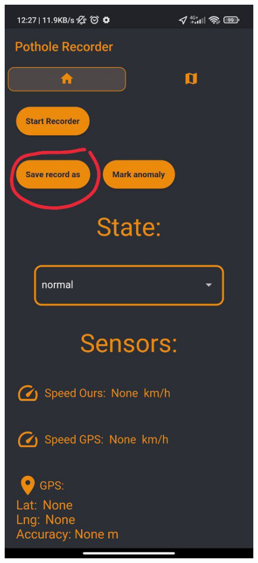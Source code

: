 \begin{figure}[htb]
		\includegraphics[scale = 0.175]{Graphics/apk_save_recording_1.jpg}

\end{figure}
